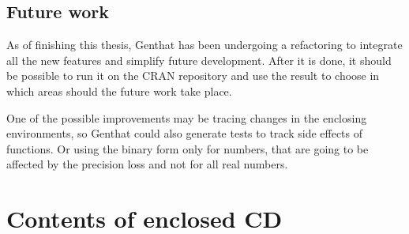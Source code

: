 \documentclass[thesis=B,english]{FITthesis}[2012/10/20]
\begin{document}
\section{Future work}
As of finishing this thesis, Genthat has been undergoing a refactoring to integrate all the new features and simplify future development. After it is done, it should be possible to run it on the CRAN repository and use the result to choose in which areas should the future work take place.

One of the possible improvements may be tracing changes in the enclosing environments, so Genthat could also generate tests to track side effects of functions. Or using the binary form only for numbers, that are going to be affected by the precision loss and not for all real numbers.





\appendix

\chapter{Contents of enclosed CD}


\begin{figure}
\end{figure}
\end{document}

